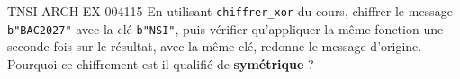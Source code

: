 \begin{exercice}{TNSI-ARCH-EX-004}{1}{15}
En utilisant \lstinline{chiffrer_xor} du cours, chiffrer le message \texttt{b"BAC2027"} avec la clé \texttt{b"NSI"}, puis vérifier qu'appliquer la même fonction une seconde fois sur le résultat, avec la même clé, redonne le message d'origine. Pourquoi ce chiffrement est-il qualifié de \textbf{symétrique} ?
\end{exercice}
